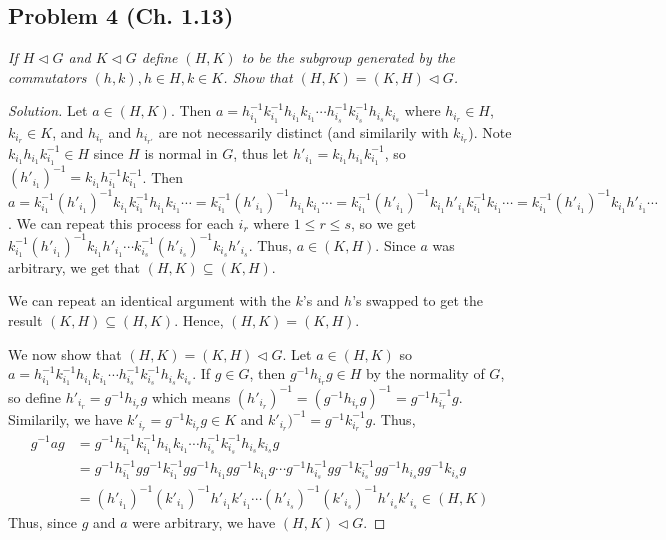 \documentclass{article}
\begin{document}
\subsection*{Problem 4 (Ch. 1.13)}
{\it If $H \triangleleft G$ and $K \triangleleft G$ define $(H,K)$
to be the subgroup generated by the commutators $(h,k), h \in H, k \in K$.
Show that $(H,K) = (K,H) \triangleleft G$.}
\begin{proof}[Solution]\let\qed\relax
	Let $a \in (H,K)$.
	Then $a = h_{i_1}^{-1}k_{i_1}^{-1}h_{i_1}k_{i_1} \cdots
	h_{i_s}^{-1}k_{i_s}^{-1}h_{i_s}k_{i_s}$
	where $h_{i_r} \in H$, $k_{i_r} \in K$, and $h_{i_r}$ and $h_{i_{r'}}$
	are not necessarily distinct (and similarily with $k_{i_r}$).
	Note $k_{i_1}h_{i_1}k_{i_1}^{-1} \in H$ since $H$ is normal in $G$,
	thus let $h'_{i_1} = k_{i_1}h_{i_1}k_{i_1}^{-1}$,
	so $(h'_{i_1})^{-1} = k_{i_1}h_{i_1}^{-1}k_{i_1}^{-1}$.
	Then $a = k_{i_1}^{-1}(h'_{i_1})^{-1}k_{i_1}k_{i_1}^{-1}h_{i_1}k_{i_1} \cdots
	= k_{i_1}^{-1}(h'_{i_1})^{-1}h_{i_1}k_{i_1} \cdots
	= k_{i_1}^{-1}(h'_{i_1})^{-1} k_{i_1}h'_{i_1}k_{i_1}^{-1}k_{i_1} \cdots
	= k_{i_1}^{-1}(h'_{i_1})^{-1}k_{i_1}h'_{i_1} \cdots$.
	We can repeat this process for each $i_r$ where $1 \leq r \leq s$,
	so we get $k_{i_1}^{-1}(h'_{i_1})^{-1}k_{i_1}h'_{i_1} \cdots
	k_{i_s}^{-1}(h'_{i_s})^{-1}k_{i_s}h'_{i_s}$.
	Thus, $a \in (K,H)$.
	Since $a$ was arbitrary, we get that $(H,K) \subseteq (K,H)$.

	We can repeat an identical argument with the $k$'s and $h$'s
	swapped to get the result $(K,H) \subseteq (H,K)$.
	Hence, $(H,K) = (K,H)$.

	We now show that $(H,K) = (K,H) \triangleleft G$.
	Let $a \in (H,K)$ so $a = h_{i_1}^{-1}k_{i_1}^{-1}h_{i_1}k_{i_1} \cdots
	h_{i_s}^{-1}k_{i_s}^{-1}h_{i_s}k_{i_s}$.
	If $g \in G$, then $g^{-1}h_{i_r}g \in H$ by the normality of $G$,
	so define $h'_{i_r} = g^{-1}h_{i_r}g$ which means
	$(h'_{i_r})^{-1} = (g^{-1}h_{i_r}g)^{-1} = g^{-1}h_{i_r}^{-1}g$.
	Similarily, we have $k'_{i_r} = g^{-1}k_{i_r}g \in K$
	and $k'_{i_r})^{-1} = g^{-1}k_{i_r}^{-1}g$.
	Thus,
	\begin{align*}
		g^{-1}ag
		&= g^{-1}h_{i_1}^{-1}k_{i_1}^{-1}h_{i_1}k_{i_1} \cdots
		h_{i_s}^{-1}k_{i_s}^{-1}h_{i_s}k_{i_s}g\\
		&= g^{-1}h_{i_1}^{-1}gg^{-1}k_{i_1}^{-1}gg^{-1}h_{i_1}gg^{-1}k_{i_1}g \cdots
		g^{-1}h_{i_s}^{-1}gg^{-1}k_{i_s}^{-1}gg^{-1}h_{i_s}gg^{-1}k_{i_s}g\\
		&= (h'_{i_1})^{-1}(k'_{i_1})^{-1}h'_{i_1}k'_{i_1} \cdots
		(h'_{i_s})^{-1}(k'_{i_s})^{-1}h'_{i_s}k'_{i_s} \in (H,K)
	\end{align*}
	Thus, since $g$ and $a$ were arbitrary,
	we have $(H,K) \triangleleft G$.
\end{proof}
\end{document}
